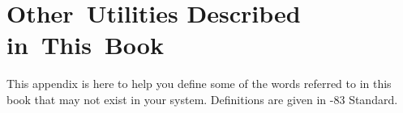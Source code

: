 \chapter{Other~Utilities Described in~This~Book}

\initial This appendix is here to help you define some of the words 
referred to in this book that may not exist in your system.
Definitions are given in \Forth{}-83 Standard.


